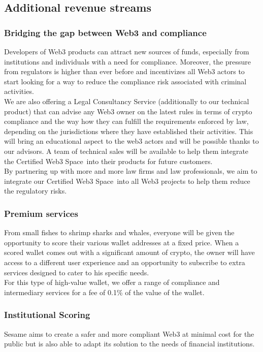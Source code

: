 ﻿\documentclass[a4paper]{article}
\begin{document}
\subsection{Additional revenue streams}
\subsubsection{Bridging the gap between Web3 and compliance}
Developers of Web3 products can attract new sources of funds, especially from institutions and individuals with a need for compliance. Moreover, the pressure from regulators is higher than ever before and incentivizes all Web3 actors to start looking for a way to reduce the compliance risk associated with criminal activities. \\

We are also offering a Legal Consultancy Service (additionally to our technical product) that can advise any Web3 owner on the latest rules in terms of crypto compliance and the way how they can fulfill the requirements enforced by law, depending on the jurisdictions where they have established their activities. This will bring an educational aspect to the web3 actors and will be possible thanks to our advisors. A team of technical sales will be available to help them integrate the Certified Web3 Space\texttrademark\ into their products for future customers. \\

By partnering up with more and more law firms and law professionals, we aim to integrate our Certified Web3 Space\texttrademark\ into all Web3 projects to help them reduce the regulatory risks.

\subsubsection{Premium services}
From small fishes to shrimp sharks and whales, everyone will be given the opportunity to score their various wallet addresses at a fixed price. When a scored wallet comes out with a significant amount of crypto, the owner will have access to a different user experience and an opportunity to subscribe to extra services designed to cater to his specific needs. \\

For this type of high-value wallet, we offer a range of compliance and intermediary services for a fee of 0.1\% of the value of the wallet. 

\subsubsection{Institutional Scoring}
Sesame aims to create a safer and more compliant Web3 at minimal cost for the public but is also able to adapt its solution to the needs of financial institutions. \\
\end{document}
